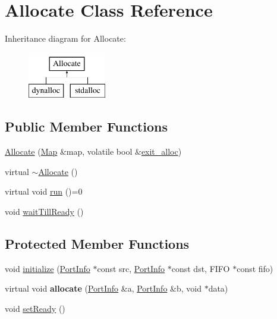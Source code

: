 \hypertarget{class_allocate}{}\section{Allocate Class Reference}
\label{class_allocate}
Inheritance diagram for Allocate\+:\begin{figure}[H]
\begin{center}
\leavevmode
\includegraphics[height=2.000000cm]{class_allocate}
\end{center}
\end{figure}
\subsection*{Public Member Functions}
\begin{DoxyCompactItemize}
\item 
\hyperlink{class_allocate_a61d8b01e404c23ead20068035e3ba540}{Allocate} (\hyperlink{class_map}{Map} \&map, volatile bool \&\hyperlink{class_allocate_a4d10076b88ab1297c89b8a05e117b510}{exit\+\_\+alloc})
\item 
virtual \hyperlink{class_allocate_a68cd61da26f3b82da094b6d3e5d556f5}{$\sim$\+Allocate} ()
\item 
virtual void \hyperlink{class_allocate_a44f9b51c382fec159233609e21b9d272}{run} ()=0
\item 
void \hyperlink{class_allocate_a3123c2c1d9584974ce19b47fe6ceea17}{wait\+Till\+Ready} ()
\end{DoxyCompactItemize}
\subsection*{Protected Member Functions}
\begin{DoxyCompactItemize}
\item 
void \hyperlink{class_allocate_a1d5c71b5cd6fc9671ed82d9c1d04965c}{initialize} (\hyperlink{struct_port_info}{Port\+Info} $\ast$const src, \hyperlink{struct_port_info}{Port\+Info} $\ast$const dst, F\+I\+F\+O $\ast$const fifo)
\item 
\hypertarget{class_allocate_a901eb0fdb6cffd56019c9ab9f2b25f92}{}virtual void {\bfseries allocate} (\hyperlink{struct_port_info}{Port\+Info} \&a, \hyperlink{struct_port_info}{Port\+Info} \&b, void $\ast$data)\label{class_allocate_a901eb0fdb6cffd56019c9ab9f2b25f92}

\item 
void \hyperlink{class_allocate_a4cf36bb704e43f5736a0e736d9e1a81b}{set\+Ready} ()
\end{DoxyCompactItemize}
